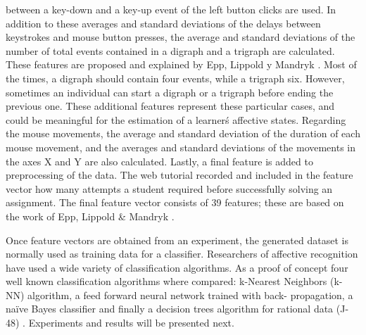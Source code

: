 \documentclass[a4paper,twoside]{article}
\begin{document}
between a key-down and a key-up event of the left button clicks are used. In
addition to these averages and standard deviations of the delays between
keystrokes and mouse button presses, the average and standard deviations of the
number of total events contained in a digraph and a trigraph are calculated.
These features are proposed and explained by Epp, Lippold y Mandryk \cite{epp2011identifying}. Most
of the times, a digraph should contain four events, while a trigraph six.
However, sometimes an individual can start a digraph or a trigraph before ending
the previous one. These additional features represent these particular cases,
and could be meaningful for the estimation of a learner\'s affective states.
Regarding the mouse movements, the average and standard deviation of the
duration of each mouse movement, and the averages and standard deviations of the
movements in the axes X and Y are also calculated. Lastly, a final feature is
added to preprocessing of the data. The web tutorial recorded  and included in the feature vector how many attempts
a student required before successfully solving an assignment. The final feature vector
consists of 39 features; these are based on the work of Epp, Lippold \& Mandryk
\cite{epp2011identifying}.

Once feature vectors are obtained from an experiment, the generated dataset is
normally used as training data for a classifier. Researchers of affective
recognition have used a wide variety of classification algorithms. As a proof of
concept four well known classification algorithms where compared: k-Nearest
Neighbors (k-NN) algorithm, a feed forward neural network trained with back-
propagation, a na\"ive Bayes classifier and finally a decision trees algorithm for
rational data (J-48) \cite{tan2006introduction}. Experiments and results will be presented next. 
\end{document}
